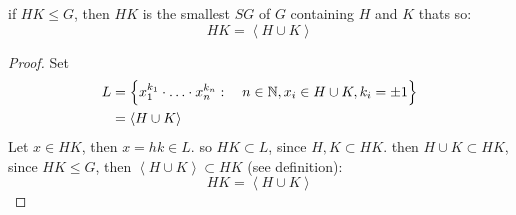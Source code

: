 \begin{proposition}[]
if $HK \leq G $, then $HK $ is the smallest $SG $ of $G $ containing $H $ and $K $ thats so: 
\[
HK = \left\langle H \cup  K \right\rangle 
\]
\end{proposition}
\begin{proof}
Set 
\begin{align*}
  L &= \left\{ x_1^{k_1} \cdot \hdots \cdot x_n ^{k_n }: \quad 
n \in \mathbb{N}, x_{i} \in H \cup K, k_{i} = \pm 1\right\}  \\
    &= \left\langle H \cup K \right\rangle 
\end{align*}
Let $x \in HK $, then $x = hk \in L $. so $HK \subset L $, since 
$H, K \subset HK $. then $H \cup K \subset HK $, since $HK \leq G $, then 
$\left\langle H \cup K \right\rangle \subset HK $ (see definition): 
\[
HK = \left\langle H \cup K \right\rangle 
\]
\end{proof}

